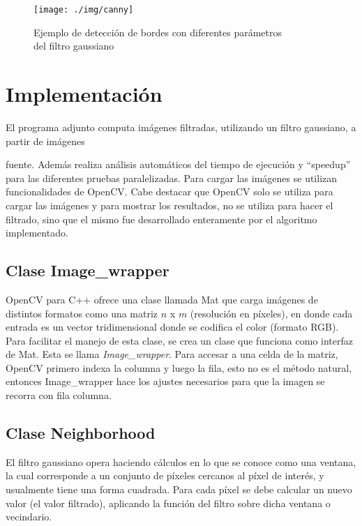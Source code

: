 \documentclass {article}
\begin{document}
\begin{figure}[ht]
  \centering
  \texttt{[image: ./img/canny]} %
  \caption{\label{fig:canny}Ejemplo de detección de bordes con diferentes parámetros \\del filtro gaussiano}
\end{figure}




\section{Implementación}

El programa adjunto computa imágenes filtradas, utilizando un filtro gaussiano, a partir de imágenes

fuente. Además realiza análisis automáticos del tiempo de ejecución y ``speedup'' para las
diferentes pruebas paralelizadas. Para cargar las imágenes se utilizan funcionalidades de
OpenCV. %
Cabe destacar que OpenCV solo se utiliza para cargar las imágenes y para mostrar los
resultados, no se utiliza para hacer el filtrado, sino que el mismo fue desarrollado enteramente por
el algoritmo implementado.


\subsection{Clase Image\_wrapper}

OpenCV para C++ ofrece una clase llamada Mat que carga imágenes de distintos formatos como una
matriz $n$ x $m$ (resolución en píxeles), en donde cada entrada es un vector tridimensional donde se
codifica el color (formato RGB). Para facilitar el manejo de esta clase, se crea un clase que
funciona como interfaz de Mat. Esta se llama \textit{Image\_wrapper}. Para accesar a una celda de la
matriz, OpenCV primero indexa la columna y luego la fila, esto no es el método natural, entonces
Image\_wrapper hace los ajustes necesarios para que la imagen se recorra con fila columna.


\subsection{Clase Neighborhood}
El filtro gaussiano opera haciendo cálculos en lo que se conoce como una ventana, la cual
corresponde a un conjunto de píxeles cercanos al píxel de interés, y usualmente tiene una forma
cuadrada. Para cada píxel se debe calcular un nuevo valor (el valor filtrado), aplicando la función
del filtro sobre dicha ventana o vecindario.
\end{document}
